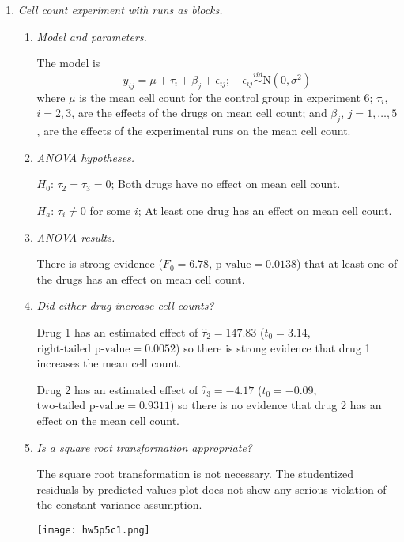 \documentclass[11pt]{article}
\begin{document}
\begin{enumerate}
\item %
\emph{Cell count experiment with runs as blocks.}

\begin{enumerate}

\item %
\emph{Model and parameters.}

The model is
\begin{equation*}
y_{ij}=\mu+\tau_i+\beta_j+\epsilon_{ij};\quad\epsilon_{ij}\overset{iid}{\sim}\mathrm{N}(0,\sigma^2)
\end{equation*}
where \(\mu\) is the mean cell count for the control group in experiment 6;
\(\tau_i\), \(i=2,3\), are the effects of the drugs on mean cell count; and
\(\beta_j\), \(j=1,\dots,5\), are the effects of the experimental runs on the
mean cell count.

\item %
\emph{ANOVA hypotheses.}

\(H_0\): \(\tau_2=\tau_3=0\); Both drugs have no effect on mean cell count.

\(H_a\): \(\tau_i\neq 0\) for some \(i\); At least one drug has an effect on
mean cell count.

\pagebreak
\item %
\emph{ANOVA results.}

There is strong evidence (\(F_0=6.78\), \(\text{p-value}=0.0138\)) that at
least one of the drugs has an effect on mean cell count.

{\footnotesize}

\item %
\emph{Did either drug increase cell counts?}

Drug 1 has an estimated effect of \(\widehat{\tau}_2=147.83\) (\(t_0=3.14\),
\(\text{right-tailed p-value}=0.0052\)) so there is strong evidence that
drug 1 increases the mean cell count.

Drug 2 has an estimated effect of \(\widehat{\tau}_3=-4.17\) (\(t_0=-0.09\),
\(\text{two-tailed p-value}=0.9311\)) so there is no evidence that drug 2
has an effect on the mean cell count.

\item %
\emph{Is a square root transformation appropriate?}

The square root transformation is not necessary. The studentized residuals
by predicted values plot does not show any serious violation of the constant
variance assumption.

\begin{center}
\texttt{[image: hw5p5c1.png]}
\end{center}


\end{enumerate}
\end{enumerate}
\end{document}
